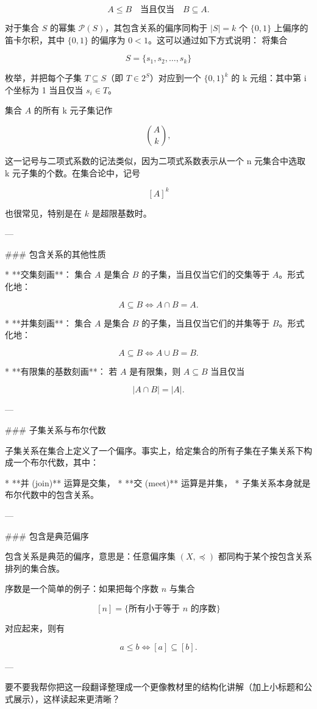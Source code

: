 $$
A \leq B \quad \text{当且仅当} \quad B \subseteq A.
$$

对于集合 $S$ 的幂集 $\mathcal{P}(S)$，其包含关系的偏序同构于 $|S|=k$ 个 $\{0,1\}$ 上偏序的笛卡尔积，其中 $\{0,1\}$ 的偏序为 $0<1$。这可以通过如下方式说明：
将集合

$$
S = \{s_{1}, s_{2}, \ldots, s_{k}\}
$$

枚举，并把每个子集 $T \subseteq S$（即 $T \in 2^{S}$）对应到一个 $\{0,1\}^{k}$ 的 k 元组：其中第 i 个坐标为 1 当且仅当 $s_i \in T$。

集合 $A$ 的所有 k 元子集记作

$$
\binom{A}{k},
$$

这一记号与二项式系数的记法类似，因为二项式系数表示从一个 n 元集合中选取 k 元子集的个数。在集合论中，记号

$$
[A]^k
$$

也很常见，特别是在 $k$ 是超限基数时。

---

### 包含关系的其他性质

* **交集刻画**：
  集合 $A$ 是集合 $B$ 的子集，当且仅当它们的交集等于 $A$。形式化地：

$$
A \subseteq B \iff A \cap B = A.
$$

* **并集刻画**：
  集合 $A$ 是集合 $B$ 的子集，当且仅当它们的并集等于 $B$。形式化地：

$$
A \subseteq B \iff A \cup B = B.
$$

* **有限集的基数刻画**：
  若 $A$ 是有限集，则 $A \subseteq B$ 当且仅当

$$
|A \cap B| = |A|.
$$

---

### 子集关系与布尔代数

子集关系在集合上定义了一个偏序。事实上，给定集合的所有子集在子集关系下构成一个布尔代数，其中：

* **并 (join)** 运算是交集，
* **交 (meet)** 运算是并集，
* 子集关系本身就是布尔代数中的包含关系。

---

### 包含是典范偏序

包含关系是典范的偏序，意思是：任意偏序集 $(X, \preceq)$ 都同构于某个按包含关系排列的集合族。

序数是一个简单的例子：如果把每个序数 $n$ 与集合

$$
[n] = \{ \text{所有小于等于 } n \text{ 的序数} \}
$$

对应起来，则有

$$
a \leq b \iff [a] \subseteq [b].
$$

---

要不要我帮你把这一段翻译整理成一个更像教材里的结构化讲解（加上小标题和公式展示），这样读起来更清晰？
